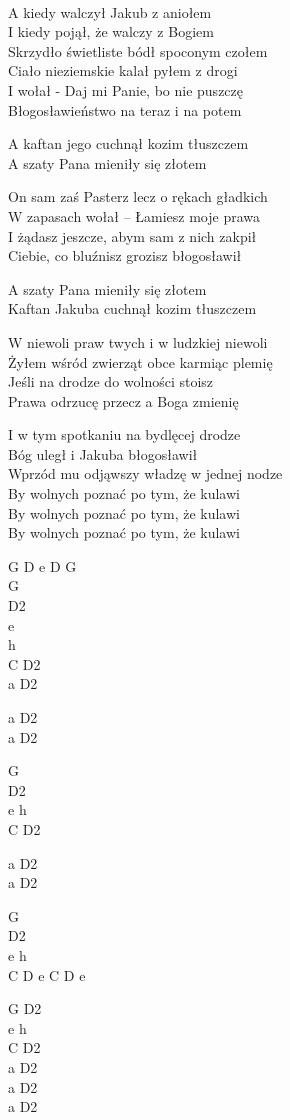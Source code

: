 \begin{text}
    \ifchorded{\hfill\break}\\
    A kiedy walczył Jakub z aniołem\\
    I kiedy pojął, że walczy z Bogiem\\
    Skrzydło świetliste bódł spoconym czołem\\
    Ciało nieziemskie kalał pyłem z drogi\\
    I wołał - Daj mi Panie, bo nie puszczę\\
    Błogosławieństwo na teraz i na potem

    A kaftan jego cuchnął kozim tłuszczem\\
    A szaty Pana mieniły się złotem

    On sam zaś Pasterz lecz o rękach gładkich\\
    W zapasach wołał – Łamiesz moje prawa\\
    I żądasz jeszcze, abym sam z nich zakpił\\
    Ciebie, co bluźnisz grozisz błogosławił

    A szaty Pana mieniły się złotem\\
    Kaftan Jakuba cuchnął kozim tłuszczem

    W niewoli praw twych i w ludzkiej niewoli\\
    Żyłem wśród zwierząt obce karmiąc plemię\\
    Jeśli na drodze do wolności stoisz\\
    Prawa odrzucę przecz a Boga zmienię

    I w tym spotkaniu na bydlęcej drodze\\
    Bóg uległ i Jakuba błogosławił\\
    Wprzód mu odjąwszy władzę w jednej nodze\\
    By wolnych poznać po tym, że kulawi\\
    By wolnych poznać po tym, że kulawi\\
    By wolnych poznać po tym, że kulawi
\end{text}
\begin{chord}
    G D e D G\\
    G\\
    D2\\
    e\\
    h\\
    C D2\\
    a D2

    a D2\\
    a D2

    G\\
    D2\\
    e h\\
    C D2

    a D2\\
    a D2

    G\\
    D2\\
    e h\\
    C D e C D e

    G D2\\
    e h\\
    C D2\\
    a D2\\
    a D2\\
    a D2
\end{chord}